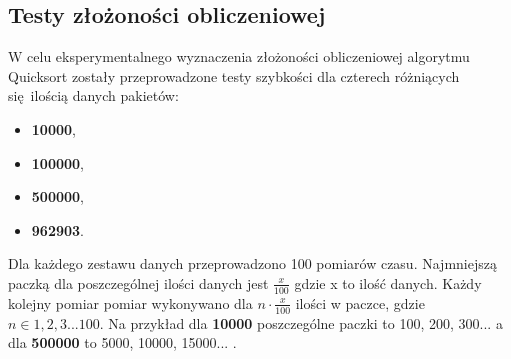 \documentclass[12pt]{article}
\begin{document}
\subsection{Testy złożoności obliczeniowej}
W celu eksperymentalnego wyznaczenia złożoności obliczeniowej algorytmu Quicksort zostały przeprowadzone testy szybkości dla 
czterech różniących się ilością danych pakietów: 
\begin{itemize}
       \item \textbf{10000},
       \item  \textbf{100000},
       \item \textbf{500000},
       \item \textbf{962903}.
\end{itemize}
Dla każdego zestawu danych przeprowadzono 100 pomiarów czasu. Najmniejszą paczką dla poszczególnej ilości danych jest 
$\frac{x}{100}$ gdzie x to ilość danych. Każdy kolejny pomiar pomiar wykonywano dla $n \cdot \frac{x}{100}$ ilości w paczce,
gdzie $n \in 1,2,3 ... 100$.
Na przykład dla \textbf{10000} poszczególne paczki to 100, 200, 300... a dla \textbf{500000} to 5000, 10000, 15000... .

\begin{figure}[H]
       \centering
       \subfloat[dsda]{}
       \quad
       \subfloat[dsda]{}
       \quad
       \subfloat[dsda]{}
       \quad
       \subfloat[dsda]{}

\end{figure}
\end{document}
